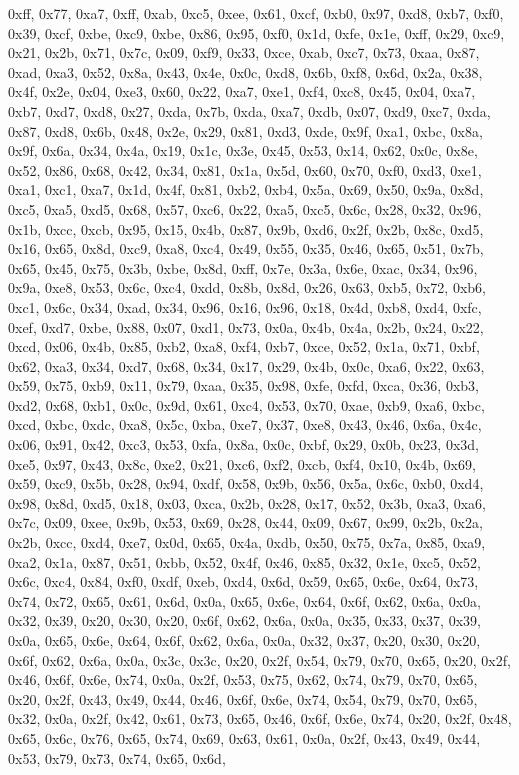 \documentclass[
]{book}
\begin{document}
0xff, 0x77, 0xa7, 0xff, 0xab, 0xc5, 0xee, 0x61, 0xcf, 0xb0, 0x97, 0xd8, 0xb7, 0xf0, 0x39, 0xcf, 0xbe, 0xc9, 0xbe, 0x86, 0x95, 0xf0, 0x1d, 0xfe, 0x1e, 0xff, 0x29, 0xc9, 0x21, 0x2b, 0x71, 0x7c, 0x09, 0xf9, 0x33, 0xce, 0xab, 0xc7, 0x73, 0xaa, 0x87, 0xad, 0xa3, 0x52, 0x8a, 0x43, 0x4e, 0x0c, 0xd8, 0x6b, 0xf8, 0x6d, 0x2a, 0x38, 0x4f, 0x2e, 0x04, 0xe3, 0x60, 0x22, 0xa7, 0xe1, 0xf4, 0xc8, 0x45, 0x04, 0xa7, 0xb7, 0xd7, 0xd8, 0x27, 0xda, 0x7b, 0xda, 0xa7, 0xdb, 0x07, 0xd9, 0xc7, 0xda, 0x87, 0xd8, 0x6b, 0x48,
0x2e, 0x29, 0x81, 0xd3, 0xde, 0x9f, 0xa1, 0xbc, 0x8a, 0x9f, 0x6a, 0x34, 0x4a, 0x19, 0x1c, 0x3e, 0x45, 0x53, 0x14, 0x62, 0x0c, 0x8e, 0x52, 0x86, 0x68, 0x42, 0x34, 0x81, 0x1a, 0x5d, 0x60, 0x70, 0xf0, 0xd3, 0xe1, 0xa1, 0xc1, 0xa7, 0x1d, 0x4f, 0x81, 0xb2, 0xb4, 0x5a, 0x69, 0x50, 0x9a, 0x8d, 0xc5, 0xa5, 0xd5, 0x68, 0x57, 0xc6, 0x22, 0xa5, 0xc5, 0x6c, 0x28, 0x32, 0x96, 0x1b, 0xcc, 0xcb, 0x95, 0x15, 0x4b, 0x87, 0x9b, 0xd6, 0x2f, 0x2b, 0x8c, 0xd5, 0x16, 0x65, 0x8d, 0xc9, 0xa8, 0xc4, 0x49, 0x55, 0x35, 0x46,
0x65, 0x51, 0x7b, 0x65, 0x45, 0x75, 0x3b, 0xbe, 0x8d, 0xff, 0x7e, 0x3a, 0x6e, 0xac, 0x34, 0x96, 0x9a, 0xe8, 0x53, 0x6c, 0xc4, 0xdd, 0x8b, 0x8d, 0x26, 0x63, 0xb5, 0x72, 0xb6, 0xc1, 0x6c, 0x34, 0xad, 0x34, 0x96, 0x16, 0x96, 0x18, 0x4d, 0xb8, 0xd4, 0xfc, 0xef, 0xd7, 0xbe, 0x88, 0x07, 0xd1, 0x73, 0x0a, 0x4b, 0x4a, 0x2b, 0x24, 0x22, 0xcd, 0x06, 0x4b, 0x85, 0xb2, 0xa8, 0xf4, 0xb7, 0xce, 0x52, 0x1a, 0x71, 0xbf, 0x62, 0xa3, 0x34, 0xd7, 0x68, 0x34, 0x17, 0x29, 0x4b, 0x0c, 0xa6, 0x22, 0x63, 0x59, 0x75, 0xb9,
0x11, 0x79, 0xaa, 0x35, 0x98, 0xfe, 0xfd, 0xca, 0x36, 0xb3, 0xd2, 0x68, 0xb1, 0x0c, 0x9d, 0x61, 0xc4, 0x53, 0x70, 0xae, 0xb9, 0xa6, 0xbc, 0xcd, 0xbc, 0xdc, 0xa8, 0x5c, 0xba, 0xe7, 0x37, 0xe8, 0x43, 0x46, 0x6a, 0x4c, 0x06, 0x91, 0x42, 0xc3, 0x53, 0xfa, 0x8a, 0x0c, 0xbf, 0x29, 0x0b, 0x23, 0x3d, 0xe5, 0x97, 0x43, 0x8c, 0xe2, 0x21, 0xc6, 0xf2, 0xcb, 0xf4, 0x10, 0x4b, 0x69, 0x59, 0xc9, 0x5b, 0x28, 0x94, 0xdf, 0x58, 0x9b, 0x56, 0x5a, 0x6c, 0xb0, 0xd4, 0x98, 0x8d, 0xd5, 0x18, 0x03, 0xca, 0x2b, 0x28, 0x17,
0x52, 0x3b, 0xa3, 0xa6, 0x7c, 0x09, 0xee, 0x9b, 0x53, 0x69, 0x28, 0x44, 0x09, 0x67, 0x99, 0x2b, 0x2a, 0x2b, 0xcc, 0xd4, 0xe7, 0x0d, 0x65, 0x4a, 0xdb, 0x50, 0x75, 0x7a, 0x85, 0xa9, 0xa2, 0x1a, 0x87, 0x51, 0xbb, 0x52, 0x4f, 0x46, 0x85, 0x32, 0x1e, 0xc5, 0x52, 0x6c, 0xc4, 0x84, 0xf0, 0xdf, 0xeb, 0xd4, 0x6d, 0x59, 0x65, 0x6e, 0x64, 0x73, 0x74, 0x72, 0x65, 0x61, 0x6d, 0x0a, 0x65, 0x6e, 0x64, 0x6f, 0x62, 0x6a, 0x0a, 0x32, 0x39, 0x20, 0x30, 0x20, 0x6f, 0x62, 0x6a, 0x0a, 0x35, 0x33, 0x37, 0x39, 0x0a, 0x65,
0x6e, 0x64, 0x6f, 0x62, 0x6a, 0x0a, 0x32, 0x37, 0x20, 0x30, 0x20, 0x6f, 0x62, 0x6a, 0x0a, 0x3c, 0x3c, 0x20, 0x2f, 0x54, 0x79, 0x70, 0x65, 0x20, 0x2f, 0x46, 0x6f, 0x6e, 0x74, 0x0a, 0x2f, 0x53, 0x75, 0x62, 0x74, 0x79, 0x70, 0x65, 0x20, 0x2f, 0x43, 0x49, 0x44, 0x46, 0x6f, 0x6e, 0x74, 0x54, 0x79, 0x70, 0x65, 0x32, 0x0a, 0x2f, 0x42, 0x61, 0x73, 0x65, 0x46, 0x6f, 0x6e, 0x74, 0x20, 0x2f, 0x48, 0x65, 0x6c, 0x76, 0x65, 0x74, 0x69, 0x63, 0x61, 0x0a, 0x2f, 0x43, 0x49, 0x44, 0x53, 0x79, 0x73, 0x74, 0x65, 0x6d,
\end{document}
